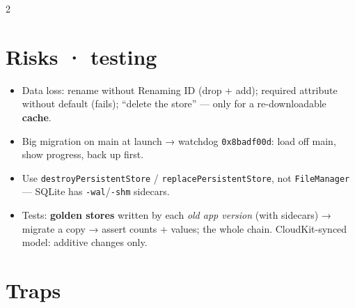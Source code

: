 \documentclass[8pt]{extarticle}
\begin{document}
\begin{multicols}{2}
\section{Risks · testing}
\begin{itemize}
  \item Data loss: rename without Renaming ID (drop + add); required attribute without
        default (fails); ``delete the store'' — only for a re-downloadable \textbf{cache}.
  \item Big migration on main at launch → watchdog \texttt{0x8badf00d}: load off main,
        show progress, back up first.
  \item Use \texttt{destroyPersistentStore} / \texttt{replacePersistentStore}, not
        \texttt{FileManager} — SQLite has \texttt{-wal}/\texttt{-shm} sidecars.
  \item Tests: \textbf{golden stores} written by each \emph{old app version} (with
        sidecars) → migrate a copy → assert counts + values; the whole chain.
        CloudKit-synced model: additive changes only.
\end{itemize}

\section{Traps}
\begin{itemize}
\end{itemize}

\columnbreak


\end{multicols}
\end{document}

